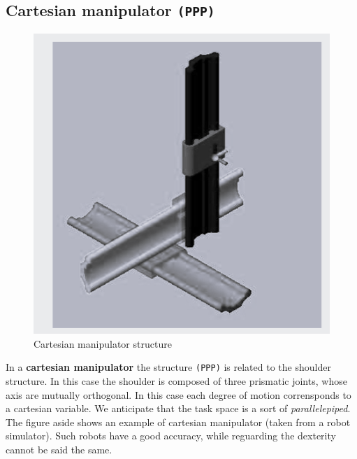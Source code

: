 \subsection{Cartesian manipulator \texttt{(PPP)}}
\begin{multicols}{2}
    \begin{figure}[H]
        \centering
        \includegraphics[scale=0.5]{img/man_cart.png}
        \caption{Cartesian manipulator structure}        
    \end{figure}
    \noindent
    In a \textbf{cartesian manipulator} the structure \texttt{(PPP)} is related to the shoulder structure. In this case the shoulder is composed of three prismatic joints, whose axis are mutually orthogonal. In this  case each degree of motion corrensponds to a cartesian variable. We anticipate that the task space is a sort of \textit{parallelepiped}. The figure aside shows an example of cartesian manipulator (taken from a robot simulator). Such robots have a good accuracy, while reguarding the dexterity cannot be said the same.
\end{multicols}
